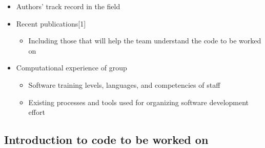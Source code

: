 \documentclass[]{scrartcl}
\begin{document}
\begin{itemize}
\itemsep1pt\parskip0pt
\item
  Authors' track record in the field
\item
  Recent publications{[}1{]}

  \begin{itemize}
  \itemsep1pt\parskip0pt
  \item
    Including those that will help the team understand the code to be
    worked on
  \end{itemize}
\item
  Computational experience of group

  \begin{itemize}
  \itemsep1pt\parskip0pt
  \item
    Software training levels, languages, and competencies of staff
  \item
    Existing processes and tools used for organizing software
    development effort
  \end{itemize}
\end{itemize}

\subsection{Introduction to code to be worked
on}\label{introduction-to-code-to-be-worked-on}
\end{document}
